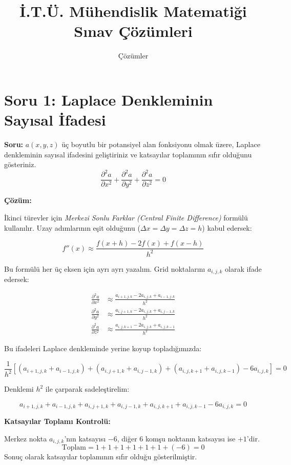 \documentclass[a4paper,12pt]{article}
\title{\textbf{İ.T.Ü. Mühendislik Matematiği Sınav Çözümleri}}
\author{Çözümler}
\date{}
\begin{document}
\maketitle

\section*{Soru 1: Laplace Denkleminin Sayısal İfadesi}

\textbf{Soru:} $a(x,y,z)$ üç boyutlu bir potansiyel alan fonksiyonu olmak üzere, Laplace denkleminin sayısal ifadesini geliştiriniz ve katsayılar toplamının sıfır olduğunu gösteriniz.
\[
\frac{\partial^2 a}{\partial x^2} + \frac{\partial^2 a}{\partial y^2} + \frac{\partial^2 a}{\partial z^2} = 0
\]

\textbf{Çözüm:}

İkinci türevler için \textit{Merkezi Sonlu Farklar (Central Finite Difference)} formülü kullanılır. Uzay adımlarının eşit olduğunu ($\Delta x = \Delta y = \Delta z = h$) kabul edersek:

\[
f''(x) \approx \frac{f(x+h) - 2f(x) + f(x-h)}{h^2}
\]

Bu formülü her üç eksen için ayrı ayrı yazalım. Grid noktalarını $a_{i,j,k}$ olarak ifade edersek:

\begin{align*}
\frac{\partial^2 a}{\partial x^2} &\approx \frac{a_{i+1,j,k} - 2a_{i,j,k} + a_{i-1,j,k}}{h^2} \\
\frac{\partial^2 a}{\partial y^2} &\approx \frac{a_{i,j+1,k} - 2a_{i,j,k} + a_{i,j-1,k}}{h^2} \\
\frac{\partial^2 a}{\partial z^2} &\approx \frac{a_{i,j,k+1} - 2a_{i,j,k} + a_{i,j,k-1}}{h^2}
\end{align*}

Bu ifadeleri Laplace denkleminde yerine koyup topladığımızda:

\[
\frac{1}{h^2} \left[ (a_{i+1,j,k} + a_{i-1,j,k}) + (a_{i,j+1,k} + a_{i,j-1,k}) + (a_{i,j,k+1} + a_{i,j,k-1}) - 6a_{i,j,k} \right] = 0
\]

Denklemi $h^2$ ile çarparak sadeleştirelim:

\[
a_{i+1,j,k} + a_{i-1,j,k} + a_{i,j+1,k} + a_{i,j-1,k} + a_{i,j,k+1} + a_{i,j,k-1} - 6a_{i,j,k} = 0
\]

\textbf{Katsayılar Toplamı Kontrolü:}

Merkez nokta $a_{i,j,k}$'nın katsayısı $-6$, diğer 6 komşu noktanın katsayısı ise $+1$'dir.
\[
\text{Toplam} = 1 + 1 + 1 + 1 + 1 + 1 + (-6) = 0
\]
Sonuç olarak katsayılar toplamının sıfır olduğu gösterilmiştir.
\end{document}
